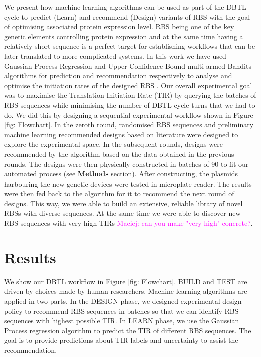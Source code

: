 \documentclass{article}
\newcommand{\mengyan}[1]{\textcolor{magenta}{#1}}
\begin{document}
We present how machine learning algorithms can be used as part of the DBTL cycle to predict (Learn) and recommend (Design) variants of RBS with the goal of optimising associated protein expression level. 
RBS being one of the key genetic elements controlling protein expression and at the same time having a relatively short sequence is a perfect target for establishing workflows that can be later translated to more complicated systems.
In this work we have used Gaussian Process Regression \cite{Rasmussen2004} and Upper Confidence Bound multi-armed Bandits algorithms \cite{desautels2012parallelizing} for prediction and recommendation respectively to analyse and optimise the initiation rates of the designed RBS .
Our overall experimental goal was to maximise the Translation Initiation Rate (TIR) by querying the batches of RBS sequences while minimising the number of DBTL cycle turns that we had to do.
We did this by designing a sequential experimental workflow shown in Figure \ref{fig: Flowchart}.
In the zeroth round, randomised RBS sequences and preliminary machine learning recommended designs based on literature were designed to explore the experimental space. 
In the subsequent rounds, designs were recommended by the algorithm based on the data obtained in the previous rounds. 
The designs were then physically constructed in batches of 90 to fit our automated process (see \textbf{Methods} section).
After constructing, the plasmids harbouring the new genetic devices were tested in microplate reader.
The results were then fed back to the algorithm for it to recommend the next round of designs.
This way, we were able to build an extensive, reliable library of novel RBSs with diverse sequences.
At the same time we were able to discover new RBS sequences with very high TIRs \mengyan{Maciej: can you make "very high" concrete?}.

\section{Results}

We show our DBTL workflow in Figure \ref{fig: Flowchart}.
BUILD and TEST are driven by choices made by human researchers.
Machine learning algorithms are applied in two parts.
In the DESIGN phase, we designed experimental design policy to recommend RBS sequences in batches so that we can identify RBS sequences with highest possible TIR. 
In LEARN phase, we use the Gaussian Process regression algorithm to predict the TIR of different RBS sequences.
The goal is to provide predictions about TIR labels and uncertainty to assist the recommendation.
\end{document}
